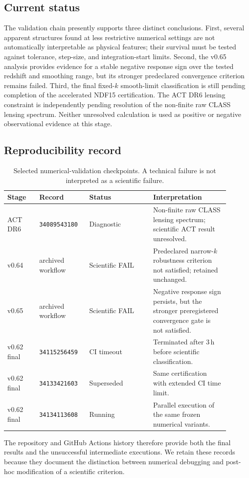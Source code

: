 \subsection{Current status}

The validation chain presently supports three distinct conclusions. First, several apparent structures found at less restrictive numerical settings are not automatically interpretable as physical features; their survival must be tested against tolerance, step-size, and integration-start limits. Second, the v0.65 analysis provides evidence for a stable negative response sign over the tested redshift and smoothing range, but its stronger predeclared convergence criterion remains failed. Third, the final fixed-$k$ smooth-limit classification is still pending completion of the accelerated NDF15 certification. The ACT DR6 lensing constraint is independently pending resolution of the non-finite raw CLASS lensing spectrum. Neither unresolved calculation is used as positive or negative observational evidence at this stage.

\subsection{Reproducibility record}

\begin{table}[t]
\centering
\small
\caption{Selected numerical-validation checkpoints. A technical failure is not interpreted as a scientific failure.}
\label{tab:aest_validation_log}
\begin{tabular}{p{0.13\linewidth}p{0.20\linewidth}p{0.26\linewidth}p{0.31\linewidth}}
\toprule
Stage & Record & Status & Interpretation \\
\midrule
ACT DR6 & \texttt{34089543180} & Diagnostic & Non-finite raw CLASS lensing spectrum; scientific ACT result unresolved. \\
v0.64 & archived workflow & Scientific FAIL & Predeclared narrow-$k$ robustness criterion not satisfied; retained unchanged. \\
v0.65 & archived workflow & Scientific FAIL & Negative response sign persists, but the stronger preregistered convergence gate is not satisfied. \\
v0.62 final & \texttt{34115256459} & CI timeout & Terminated after 3\,h before scientific classification. \\
v0.62 final & \texttt{34133421603} & Superseded & Same certification with extended CI time limit. \\
v0.62 final & \texttt{34134113608} & Running & Parallel execution of the same frozen numerical variants. \\
\bottomrule
\end{tabular}
\end{table}

The repository and GitHub Actions history therefore provide both the final results and the unsuccessful intermediate executions. We retain these records because they document the distinction between numerical debugging and post-hoc modification of a scientific criterion.
